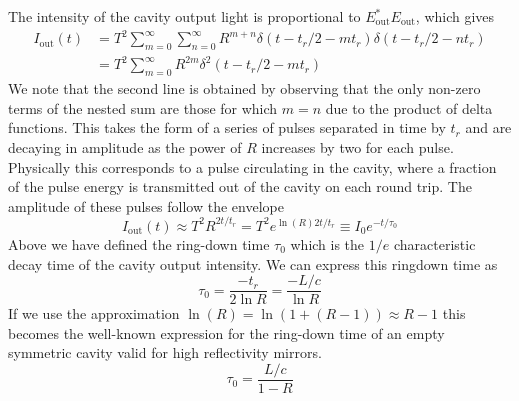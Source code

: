 The intensity of the cavity output light is proportional to $E^*_\mathrm{out} E_\mathrm{out}$, which gives
\begin{align}
	I_\mathrm{out}(t) &= T^2 \sum_{m=0}^\infty\sum_{n=0}^\infty R^{m+n} \delta(t - t_r/2 - m t_r)\delta(t - t_r/2 - n t_r) \nonumber \\
	&= T^2 \sum_{m=0}^\infty R^{2m} \delta^2(t - t_r/2 - m t_r)
\end{align}
We note that the second line is obtained by observing that the only non-zero terms of the nested sum are those for which $m=n$ due to the product of delta functions. This takes the form of a series of pulses separated in time by $t_r$ and are decaying in amplitude as the power of $R$ increases by two for each pulse. Physically this corresponds to a pulse circulating in the cavity, where a fraction of the pulse energy is transmitted out of the cavity on each round trip. The amplitude of these pulses follow the envelope
\begin{equation}
	I_\mathrm{out}(t) \approx T^2R^{2t/t_r} = T^2 e^{\ln(R) 2t/t_r} \equiv I_0e^{-t/\tau_0}
\end{equation}
Above we have defined the ring-down time $\tau_0$ which is the $1/e$ characteristic decay time of the cavity output intensity. We can express this ringdown time as
\begin{equation} \label{tau_vac_exact}
	\tau_0 = \frac{-t_r}{2\ln R} = \frac{-L/c}{\ln R}
\end{equation}
If we use the approximation $\ln \left(R\right) = \ln(1 + (R - 1)) \approx R-1$ this becomes the well-known expression for the ring-down time of an empty symmetric cavity valid for high reflectivity mirrors.
\begin{equation} \label{tau_vac}
	\tau_0 = \frac{L/c}{1-R}
\end{equation}

